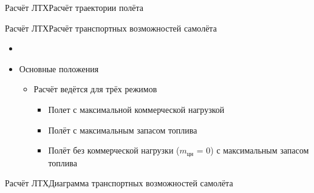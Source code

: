 \begin{frame}{Расчёт ЛТХ}{Расчёт траектории полёта}
\end{frame}

\begin{frame}{Расчёт ЛТХ}{Расчёт транспортных возможностей самолёта}
    \begin{itemize}
        \item <+-> []
        \item <+-> [] \begin{block}{Основные положения}
            \begin{itemize}
            \item <+-> [] Расчёт ведётся для трёх режимов
            \begin{itemize}
                \item <+-> Полет с максимальной коммерческой нагрузкой
                \item <+-> Полёт с максимальным запасом топлива
                \item <+-> Полёт без коммерческой нагрузки ($m_\text{цн}$ = 0) с максимальным запасом топлива
            \end{itemize}
        \end{itemize}
        \end{block}
    \end{itemize}
\end{frame}

\begin{frame}{Расчёт ЛТХ}{Диаграмма транспортных возможностей самолёта}
\end{frame}